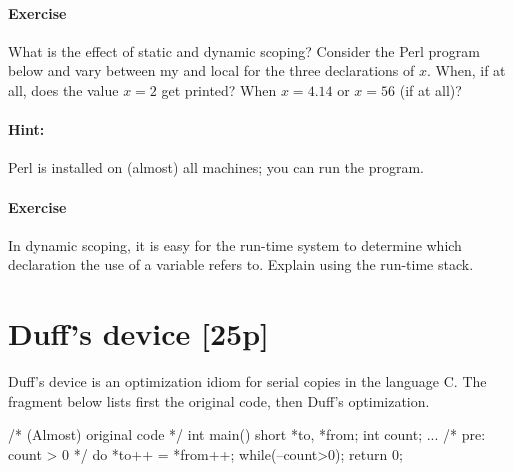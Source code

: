 \documentclass{article}
\newcommand{\mycomment}[1]{}
\newcommand{\percent}[1]{\protect \marginpar[l]{\bf [#1 points]}}
\newcounter{question}
\newenvironment{question}[1]{
  \addtocounter{question}{1}
  \paragraph{Exercise~\arabic{question}  \percent{#1}}
}{
  \vfil
}
\begin{document}
\begin{question}{X}
  What is the effect of static and dynamic scoping? Consider the Perl
  program below and vary between \textsf{my} and \textsf{local} for the
  three declarations of $x$. When, if at all, does the value $x=2$ get
  printed? When $x=4.14$ or $x=56$ (if at all)?
\end{question}

\paragraph{Hint:}
Perl is installed on (almost) all machines; you can run the program.

\begin{question}{X}
  In dynamic scoping, it is easy for the run-time system to determine
  which declaration the use of a variable refers to. Explain using the
  run-time stack.  
\end{question}

\mycomment{
Static scoping with non-local references, on the other hand,
is not so easy to implement. In particular, the kind of 
activation records discussed in class (which contain
only two kinds of internal information: the return address and the previous
activation record) does not suffice. 
%

What information would be necessary and where could it be stored? 
Make a suggestion  and 
sketch a (simple) algorithm that takes a run-time stack and an activation record,
and returns the ``right'' reference (or at least its activation record).
How expensive is your algorithm? Determine the parameters on which its
cost depends and give the cost of the algorithm.
}

\newpage 
\section{Duff's device [25p]}
Duff's device is an optimization idiom for serial copies 
in the language C. The fragment below lists first the original code,
then Duff's optimization.
\begin{cplus}
/* (Almost) original code */
int main() {
   short *to, *from;
   int count;	
   ... 
   {
     /* pre: count > 0 */		
     do
	  *to++ = *from++;		
     while(--count>0);	
   }
   return 0; 
}

\end{cplus}
\end{document}
